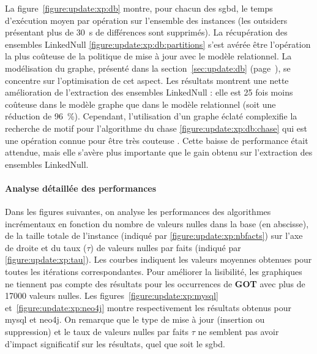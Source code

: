 La figure~\ref{figure:update:xp:db} montre, pour chacun des \gls{sgbd}, le temps d'exécution moyen par opération sur l'ensemble des instances (les outsiders présentant plus de \SI{30}{\s} de différences sont supprimés).
La récupération des ensembles \textsf{LinkedNull} \ref{figure:update:xp:db:partitions} s'est avérée être l'opération la plus coûteuse de la politique de mise à jour avec le modèle relationnel.
La modélisation du graphe, présenté dans la section~\ref{sec:update:db} (page~\pageref{sec:update:db}), se concentre sur l'optimisation de cet aspect.
Les résultats montrent une nette amélioration de l'extraction des ensembles \textsf{LinkedNull} : elle est \num{25} fois moins coûteuse dans le modèle graphe que dans le modèle relationnel (soit une réduction de \SI{96}{\percent}).
Cependant, l'utilisation d'un graphe éclaté complexifie la recherche de motif pour l'algorithme du \gls{chase} \ref{figure:update:xp:db:chase} qui est une opération connue pour être très couteuse \cite{benediktBenchmarkingChase2017}.
Cette baisse de performance était attendue, mais elle s'avère plus importante que le gain obtenu sur l'extraction des ensembles \textsf{LinkedNull}.

\paragraph{Analyse détaillée des performances}
Dans les figures suivantes, on analyse les performances des algorithmes incrémentaux en fonction du nombre de valeurs nulles dans la base (en abscisse), de la taille totale de l'instance (indiqué par \ref{figure:update:xp:nbfacts}) sur l'axe de droite et du taux ($\tau$) de valeurs nulles par faits (indiqué par \ref{figure:update:xp:tau}).
Les courbes indiquent les valeurs moyennes obtenues pour toutes les itérations correspondantes.
Pour améliorer la lisibilité, les graphiques ne tiennent pas compte des résultats pour les occurrences de \textbf{GOT} avec plus de \num{17000} valeurs nulles.
Les figures~\ref{figure:update:xp:mysql} et~\ref{figure:update:xp:neo4j} montre respectivement les résultats obtenus pour \gls{mysql} et \gls{neo4j}.
On remarque que le type de mise à jour (insertion ou suppression) et le taux de valeurs nulles par faits $\tau$ ne semblent pas avoir d'impact significatif sur les résultats, quel que soit le \gls{sgbd}.

